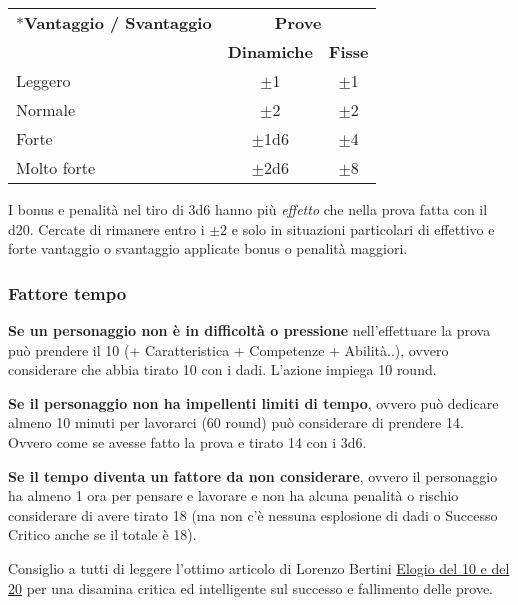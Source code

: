 \begin{multicols}{2}
\noindent\begin{tabular}{lcc}
	\toprule
\rowcolor{gray!20}\multirow{2}*{\textbf{Vantaggio / Svantaggio}} & \multicolumn{2}{c}{\textbf{Prove}}\\
\cmidrule(lr){2-3} & \textbf{Dinamiche} & \textbf{Fisse} \\
\toprule
Leggero & $\pm$1 & $\pm$1\\
\rowcolor{gray!20}Normale & $\pm$2 & $\pm$2\\
Forte & $\pm$1d6 & $\pm$4\\
\rowcolor{gray!20}Molto forte & $\pm$2d6 & $\pm$8
\end{tabular}

\begin{narratore}
I bonus e penalità nel tiro di 3d6 hanno più \emph{effetto} che nella prova fatta con il d20. Cercate di rimanere entro i $\pm2$ e solo in situazioni particolari di effettivo e forte vantaggio o svantaggio applicate bonus o penalità maggiori.
\end{narratore}

\subsubsection{Fattore tempo}\label{fattoretempo}

\textbf{Se un personaggio non è in difficoltà o pressione} nell'effettuare la prova può prendere il 10 (+ Caratteristica + Competenze + Abilità..), ovvero considerare che abbia tirato 10 con i dadi. L'azione impiega 10 round. \label{prendere10}

\textbf{Se il personaggio non ha impellenti limiti di tempo}, ovvero può dedicare almeno 10 minuti per lavorarci (60 round) può considerare di prendere 14. Ovvero come se avesse fatto la prova e tirato 14 con i 3d6. \label{prendere14}

\textbf{Se il tempo diventa un fattore da non considerare}, ovvero il personaggio ha almeno 1 ora per pensare e lavorare e non ha alcuna penalità o rischio considerare di avere tirato 18 (ma non c'è nessuna esplosione di dadi o Successo Critico anche se il totale è 18).\label{prendere18}

\begin{narratore}
Consiglio a tutti di leggere l'ottimo articolo di Lorenzo Bertini \href{https://dietroschermo.wordpress.com/2022/03/10/elogio-del-10-e-del-20}{Elogio del 10 e del 20} per una disamina critica ed intelligente sul successo e fallimento delle prove.
\end{narratore}


\end{multicols}
